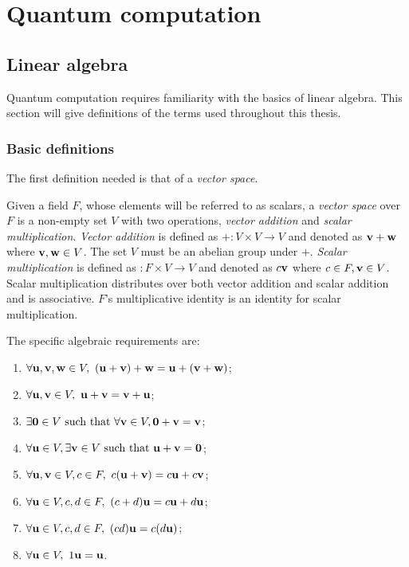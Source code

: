 
\chapter{Quantum computation}\label{chap:quantum_computation}

\section{Linear algebra} %
\label{sec:linear_algebra}

Quantum computation requires familiarity with the basics of linear algebra. This section will give
definitions of the terms used throughout this thesis.
\subsection{Basic definitions} %
\label{sub:basic_definitions}


The first definition needed is that of a \emph{vector space}.

\begin{definition}
  Given a field $F$, whose elements will be referred to as scalars, a \emph{vector space} over $F$
  is a non-empty set $V$ with two operations, \emph{vector addition} and \emph{scalar
  multiplication}. \emph{Vector addition} is defined as ${+}:V\times V \to V$ and denoted as
  $\mathbf{v}+\mathbf{w}$ where $\mathbf{v},\mathbf{w}\in V$. The set $V$ must be an abelian group under $+$.
  \emph{Scalar multiplication} is defined as ${}:F\times V \to V$ and denoted as $c\mathbf{v}$ where
  $c\in F, \mathbf{v} \in V$. Scalar multiplication distributes over both vector addition and scalar
  addition and is associative. $F$'s multiplicative identity is an identity for scalar
  multiplication.

\end{definition}
The specific algebraic requirements are:
\begin{enumerate}
  \item{}$\forall \vc{u},\vc{v},\vc{w} \in V,\ (\vc{u} +\vc{v}) +\vc{w} =
    \vc{u}+ (\vc{v}+\vc{w})$;
  \item{}$\forall \mathbf{u},\mathbf{v} \in V,\ \mathbf{u} +\mathbf{v} =
    \mathbf{v}+ \mathbf{u}$;
  \item{}$\exists  \vc{0} \in V \mathrm{\ such\ that\ } \forall \vc{v} \in V,
    \vc{0} +\vc{v} =  \vc{v}$;
  \item{}$\forall \mathbf{u} \in V, \exists \mathbf{v} \in V \mathrm{\ such\ that\ }
    \mathbf{u}+ \mathbf{v} = \mathbf{0}$;
  \item{}$\forall \mathbf{u},\mathbf{v} \in V, c\in F,\
    c(\mathbf{u}+ \mathbf{v}) = c\mathbf{u} + c\mathbf{v}$;
  \item{}$\forall \mathbf{u} \in V, c,d\in F,\
    (c+d)\mathbf{u} = c\mathbf{u} + d\mathbf{u}$;
  \item{}$\forall \mathbf{u} \in V, c,d\in F,\
    (c d)\mathbf{u} = c(d\mathbf{u})$;
  \item{}$\forall \mathbf{u} \in V,\
    1\mathbf{u} = \mathbf{u}$.
\end{enumerate}


